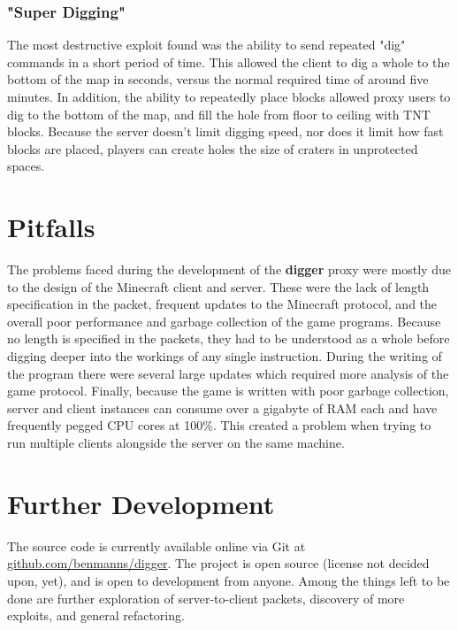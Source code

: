 \documentclass[12pt]{article}
\begin{document}
\subsubsection{"Super Digging"}
The most destructive exploit found was the ability to send repeated "dig" commands in a short period of time. This allowed the client to dig a whole to the bottom of the map in seconds, versus the normal required time of around five minutes. In addition, the ability to repeatedly place blocks allowed proxy users to dig to the bottom of the map, and fill the hole from floor to ceiling with TNT blocks. Because the server doesn't limit digging speed, nor does it limit how fast blocks are placed, players can create holes the size of craters in unprotected spaces.

\section{Pitfalls}
The problems faced during the development of the \textbf{digger} proxy were mostly due to the design of the Minecraft client and server. These were the lack of length specification in the packet, frequent updates to the Minecraft protocol, and the overall poor performance and garbage collection of the game programs. Because no length is specified in the packets, they had to be understood as a whole before digging deeper into the workings of any single instruction. During the writing of the program there were several large updates which required more analysis of the game protocol. Finally, because the game is written with poor garbage collection, server and client instances can consume over a gigabyte of RAM each and have frequently pegged CPU cores at 100\%. This created a problem when trying to run multiple clients alongside the server on the same machine.

\section{Further Development}
The source code is currently available online via Git at \href{https://github.com/benmanns/digger}{github.com/benmanns/digger}. The project is open source (license not decided upon, yet), and is open to development from anyone. Among the things left to be done are further exploration of server-to-client packets, discovery of more exploits, and general refactoring.
\end{document}
